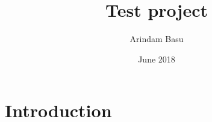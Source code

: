 \documentclass{article}
\title{Test project}
\author{Arindam Basu}
\date{June 2018}
\begin{document}
\maketitle

\section{Introduction}
\end{document}
